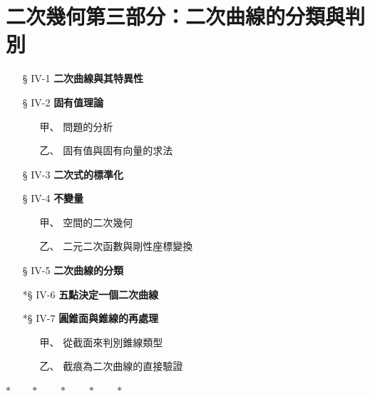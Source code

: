 
\section{二次幾何\texorpdfstring{\quad }{ }第三部分：二次曲線的分類與判別}
\label{sec:b4-ch4}

\begin{center}
\begin{minipage}{0.75\textwidth}
\begin{itemize}[leftmargin=2em, itemsep=0.3em]
  \item[§ IV-1] \textbf{二次曲線與其特異性}
  \item[§ IV-2] \textbf{固有值理論}
  \begin{itemize}[leftmargin=2em, itemsep=0.2em]
    \item[甲、] 問題的分析
    \item[乙、] 固有值與固有向量的求法
  \end{itemize}
  \item[§ IV-3] \textbf{二次式的標準化}
  \item[§ IV-4] \textbf{不變量}
  \begin{itemize}[leftmargin=2em, itemsep=0.2em]
    \item[甲、] 空間的二次幾何
    \item[乙、] 二元二次函數與剛性座標變換
  \end{itemize}
  \item[§ IV-5] \textbf{二次曲線的分類}
  \item[*§ IV-6] \textbf{五點決定一個二次曲線}
  \item[*§ IV-7] \textbf{圓錐面與錐線的再處理}
  \begin{itemize}[leftmargin=2em, itemsep=0.2em]
    \item[甲、] 從截面來判別錐線類型
    \item[乙、] 截痕為二次曲線的直接驗證
  \end{itemize}
\end{itemize}
\end{minipage}
\end{center}

\begin{center}
$* \qquad * \qquad * \qquad * \qquad *$
\end{center}

